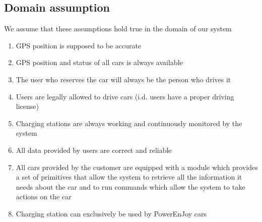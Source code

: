 \subsection{Domain assumption}
	We assume that these assumptions hold true in the domain of our system 
	\begin{enumerate}[label=\textbf{DA\arabic*}]
		\item GPS position is supposed to be accurate
		\item GPS position and status of all cars is always available
		\item The user who reserves the car will always be the person who drives it
		\item Users are legally allowed to drive cars (i.d. users have a proper driving license)
		\item Charging stations are always working and continuously monitored by the system 
		\item All data provided by users are correct and reliable
		\item All cars provided by the customer are equipped with a module which provides a set of
		primitives that allow the system to retrieve all the information it needs about
		the car and to run commands which allow the system to take actions on the car
		\item Charging station can exclusively be used by PowerEnJoy cars 
	\end{enumerate}